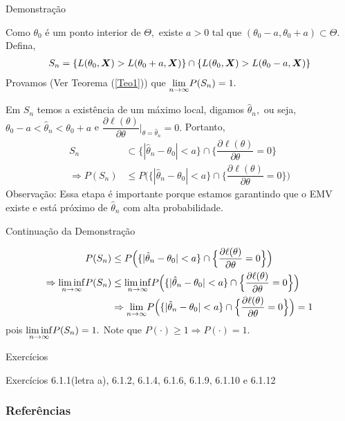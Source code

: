 \documentclass[12pt]{beamer}
\begin{document}
\begin{frame}{Demonstração}
\begin{block}{}
\justifying
Como $\theta_{0}$ é um ponto interior de $\Theta,$ existe $a>0$ tal que $(\theta_{0}-a,\theta_{0}+a)\subset\Theta.$ Defina, 
\begin{align*}
    S_{n}=\{L(\theta_{0},\boldsymbol{X})>L(\theta_{0}+a,\boldsymbol{X})\}\cap \{L(\theta_{0},\boldsymbol{X})>L(\theta_{0}-a,\boldsymbol{X})\}
\end{align*}
Provamos (Ver Teorema (\ref{Teo1})) que ${\displaystyle \lim_{n\to\infty}} P(S_{n})=1.$
\end{block}
\begin{block}{}
\justifying
Em $S_{n}$ temos a existência de um máximo local, digamos $\hat{\theta}_{n},$ ou seja, $\theta_{0}-a<\hat{\theta}_{n}<\theta_{0}+a$ e $\dfrac{\partial \ell(\theta)}{\partial\theta}|_{\theta=\hat{\theta}_{n}}=0.$ Portanto, 
\begin{align*}
    S_{n}&\subset \{|\hat{\theta}_{n}-\theta_{0}|<a\}\cap\Big\{\dfrac{\partial \ell(\theta)}{\partial\theta}=0\Big\}\\
    \Rightarrow P(S_{n})&\leq P\Big(\{|\hat{\theta}_{n}-\theta_{0}|<a\}\cap\Big\{\dfrac{\partial \ell(\theta)}{\partial\theta}=0\Big\}\Big)
\end{align*}
Observação: Essa etapa é importante porque estamos garantindo que o EMV existe e está próximo de 
$\hat{\theta}_{n}$ com alta probabilidade.
\end{block}
\end{frame}

\begin{frame}{Continuação da Demonstração}
\begin{block}{}
\begin{align*}
P(S_{n})&\leq P\Big(\{|\hat{\theta}_{n}-\theta_{0}|<a\}\cap\Big\{\dfrac{\partial \ell(\theta)}{\partial\theta}=0\Big\}\Big)\\
\Rightarrow {\displaystyle \liminf_{n\to\infty}} P(S_{n})&\leq {\displaystyle \liminf_{n\to\infty}} P\Big(\{|\hat{\theta}_{n}-\theta_{0}|<a\}\cap\Big\{\dfrac{\partial \ell(\theta)}{\partial\theta}=0\Big\}\Big)\\
&\Rightarrow {\displaystyle \lim_{n\to\infty}} P\Big(\{|\hat{\theta}_{n}-\theta_{0}|<a\}\cap\Big\{\dfrac{\partial \ell(\theta)}{\partial\theta}=0\Big\}\Big)=1
\end{align*}
pois ${\displaystyle \liminf_{n\to\infty}} P(S_{n})=1.$ Note que $P(\cdot)\geq 1\Rightarrow P(\cdot)=1.$
\end{block}
\end{frame}

\begin{frame}{Exercícios}
\begin{block}{\Home}
\justifying
Exercícios 6.1.1(letra a), 6.1.2, 6.1.4, 6.1.6,
6.1.9, 6.1.10 e 6.1.12
\nocite{hogg, casella2021statistical, bolfarine}
\end{block}
\end{frame}

\begin{frame}[allowframebreaks]
\frametitle{\bf Referências}
\printbibliography
\end{frame}
\end{document}
